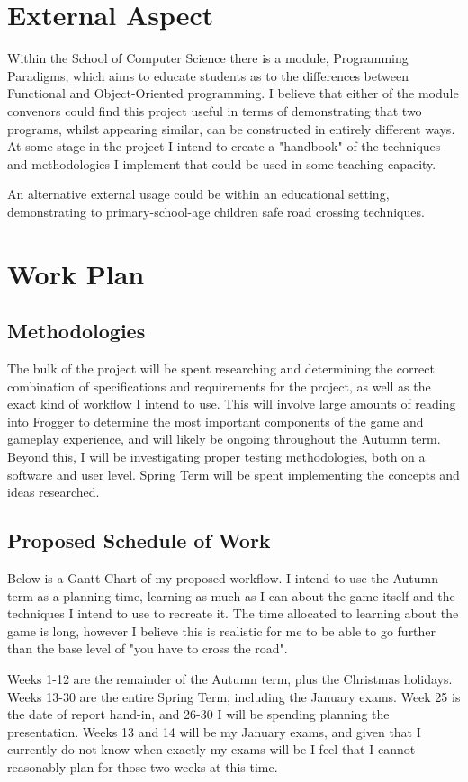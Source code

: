 \documentclass[12pt]{article}
\begin{document}
\section{External Aspect}
Within the School of Computer Science there is a module, Programming Paradigms, which aims to educate students as to the differences between Functional and Object-Oriented programming.
I believe that either of the module convenors could find this project useful in terms of demonstrating that two programs, whilst appearing similar, can be constructed in entirely different ways.
At some stage in the project I intend to create a "handbook" of the techniques and methodologies I implement that could be used in some teaching capacity.

An alternative external usage could be within an educational setting, demonstrating to primary-school-age children safe road crossing techniques.

\section{Work Plan}
\subsection{Methodologies}
The bulk of the project will be spent researching and determining the correct combination of specifications and requirements for the project, as well as the exact kind of workflow I intend to use.
This will involve large amounts of reading into Frogger to determine the most important components of the game and gameplay experience, and will likely be ongoing throughout the Autumn term.
Beyond this, I will be investigating proper testing methodologies, both on a software and user level.
Spring Term will be spent implementing the concepts and ideas researched.

\subsection{Proposed Schedule of Work}
Below is a Gantt Chart of my proposed workflow.
I intend to use the Autumn term as a planning time, learning as much as I can about the game itself and the techniques I intend to use to recreate it.
The time allocated to learning about the game is long, however I believe this is realistic for me to be able to go further than the base level of "you have to cross the road".

Weeks 1-12 are the remainder of the Autumn term, plus the Christmas holidays.
Weeks 13-30 are the entire Spring Term, including the January exams.
Week 25 is the date of report hand-in, and 26-30 I will be spending planning the presentation.
Weeks 13 and 14 will be my January exams, and given that I currently do not know when exactly my exams will be I feel that I cannot reasonably plan for those two weeks at this time.
\end{document}
